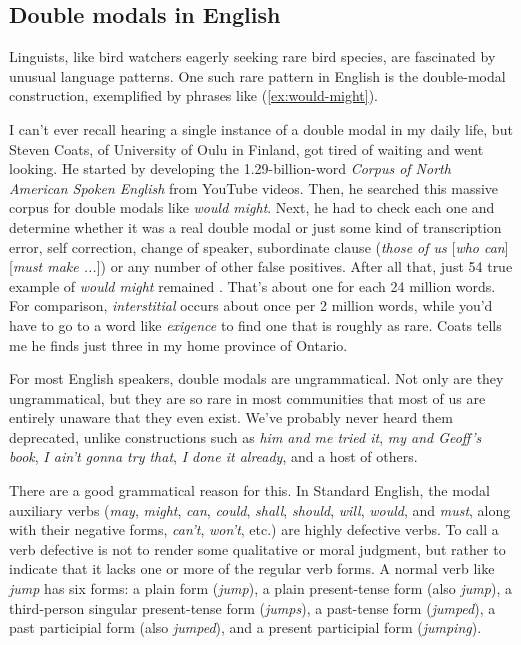 \subsection{Double modals in English}

Linguists, like bird watchers eagerly seeking rare bird species, are fascinated by unusual language patterns. One such rare pattern in English is the double-modal construction, exemplified by phrases like (\ref{ex:would-might}).

\label{ex:would-might}
\z 

I can't ever recall hearing a single instance of a double modal in my daily life, but Steven Coats, of University of Oulu in Finland, got tired of waiting and went looking. He started by developing the 1.29-billion-word \textit{Corpus of North American Spoken English} \citep{Coats2023} from YouTube videos. Then, he searched this massive corpus for double modals like \textit{would might}. Next, he had to check each one and determine whether it was a real double modal or just some kind of transcription error, self correction, change of speaker, subordinate clause (\textit{those of us }[\textit{who can}] [\textit{must make ...}]) or any number of other false positives. After all that, just 54 true example of \textit{would might} remained \citep{Coats2022}. That's about one for each 24 million words. For comparison, \textit{interstitial} occurs about once per 2 million words, while you'd have to go to a word like \textit{exigence} to find one that is roughly as rare. Coats tells me he finds just three in my home province of Ontario.

For most English speakers, double modals are ungrammatical. Not only are they ungrammatical, but they are so rare in most communities that most of us are entirely unaware that they even exist. We've probably never heard them deprecated, unlike constructions such as \textit{him and me tried it}, \textit{my and Geoff's book}, \textit{I ain't gonna try that}, \textit{I done it already}, and a host of others.

There are a good grammatical reason for this. In Standard English, the modal auxiliary verbs (\textit{may}, \textit{might}, \textit{can}, \textit{could}, \textit{shall}, \textit{should}, \textit{will}, \textit{would}, and \textit{must}, along with their negative forms, \textit{can't}, \textit{won't}, etc.) are highly defective verbs. To call a verb defective is not to render some qualitative or moral judgment, but rather to indicate that it lacks one or more of the regular verb forms. A normal verb like \textit{jump} has six forms: a plain form (\textit{jump}), a plain present-tense form (also \textit{jump}), a third-person singular present-tense form (\textit{jumps}), a past-tense form (\textit{jumped}), a past participial form (also \textit{jumped}), and a present participial form (\textit{jumping}).

